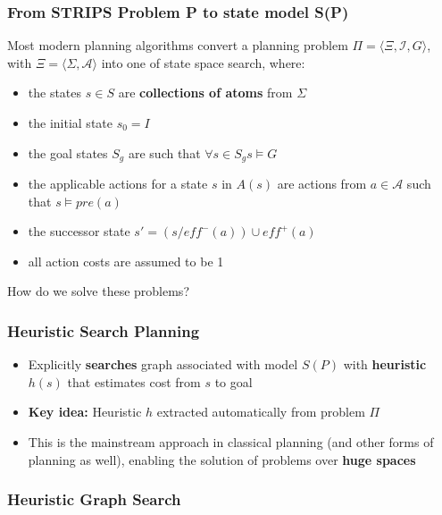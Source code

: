 \documentclass{beamer}
\begin{document}
	\begin{frame}[c]\frametitle{From STRIPS Problem P to state model S(P)}
		Most modern planning algorithms convert a planning problem $\Pi = \langle \Xi, \mathcal{I}, G\rangle$, with $\Xi = \langle \Sigma, \mathcal{A} \rangle$ into one of state space search, where:
		\begin{itemize}
			\item the states $s \in S$ are \textbf{collections of atoms} from $\Sigma$
			\item the initial state $s_0 = I$
			\item the goal states $S_g$ are such that $\forall{s \in S_g} s \models G$
			\item the applicable actions for a state $s$ in $A(s)$ are actions from $a \in  \mathcal{A}$ such that $s \models \mathit{pre}(a)$
			\item the successor state $s' = (s / \mathit{eff}^{-}(a)) \cup  \mathit{eff}^{+}(a)$
			\item all action costs are assumed to be 1
		\end{itemize}
		How do we solve these problems?
	\end{frame}
	
	\begin{frame}[c]\frametitle{Heuristic Search Planning}
		\begin{itemize}
			\item Explicitly \textbf{searches} graph associated with model $S(P)$ with \textbf{heuristic} $h(s)$ that estimates cost from $s$ to goal
			\item \textbf{Key idea:} Heuristic $h$ extracted automatically from problem $\Pi$
			\item This is the mainstream approach in classical planning (and other forms of planning as well), enabling the solution of problems over \textbf{huge spaces} 
		\end{itemize}
	\end{frame}
	
	\begin{frame}[c]\frametitle{Heuristic Graph Search}
		\begin{algorithmic}[1]
			\small
			   \Loop
				  \EndIf
				  \EndIf
					 
					\EndIf
				  \EndFor
			   \EndLoop
			\EndFunction
		\end{algorithmic}
	\end{frame}
	
\end{document}
